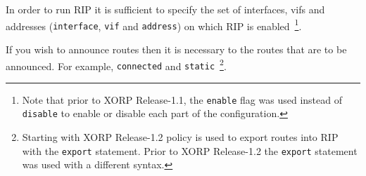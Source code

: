 In order to run RIP it is sufficient to specify the set of interfaces,
vifs and addresses ({\tt interface}, {\tt vif} and {\tt address}) on
which RIP is enabled~\footnote{Note that prior to XORP Release-1.1,
the {\tt enable} flag was used instead of {\tt disable} to enable
or disable each part of the configuration.}.

If you wish to announce routes then it is necessary to
the routes that are to be announced. For example, {\tt connected} and 
{\tt static}~\footnote{Starting with XORP Release-1.2 policy is used to
export routes into RIP with the {\tt export} statement.  Prior to XORP
Release-1.2 the {\tt export} statement was used with a different syntax.}.

\vspace{0.1in}
\noindent{}
